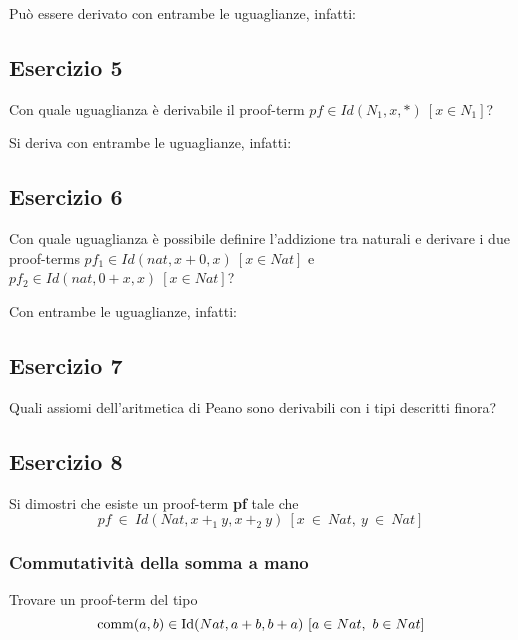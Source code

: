 Può essere derivato con entrambe le uguaglianze, infatti:



\subsection{Esercizio 5}
\begin{thm}
	Con quale uguaglianza è derivabile il proof-term $pf\in Id(N_1, x, \ast)~[x\in N_1]$?
\end{thm}
Si deriva con entrambe le uguaglianze, infatti:


\subsection{Esercizio 6}
\begin{thm}
	Con quale uguaglianza è possibile definire l'addizione tra naturali e derivare i due proof-terms $pf_1\in Id(nat, x+0,x)~[x\in Nat]$ e $pf_2\in Id(nat, 0+x,x)~[x\in Nat]$?
\end{thm}
Con entrambe le uguaglianze, infatti:


\subsection{Esercizio 7}
\begin{thm}
	Quali assiomi dell'aritmetica di Peano sono derivabili con i tipi descritti finora?
\end{thm}


\subsection{Esercizio 8}
\begin{thm}
	Si dimostri che esiste un proof-term \textbf{pf} tale che
	\[pf~\in~Id(Nat, x~+_1~y, x~+_2~y)~[x~\in~Nat,~y~\in~Nat]\]
\end{thm}
\subsubsection{Commutatività della somma a mano}
Trovare un proof-term del tipo
\[ \mathrm{comm}(a, b) \in \mathrm{Id}(Nat, a+b, b+a)\ [a\in Nat,\ b\in Nat] \]

